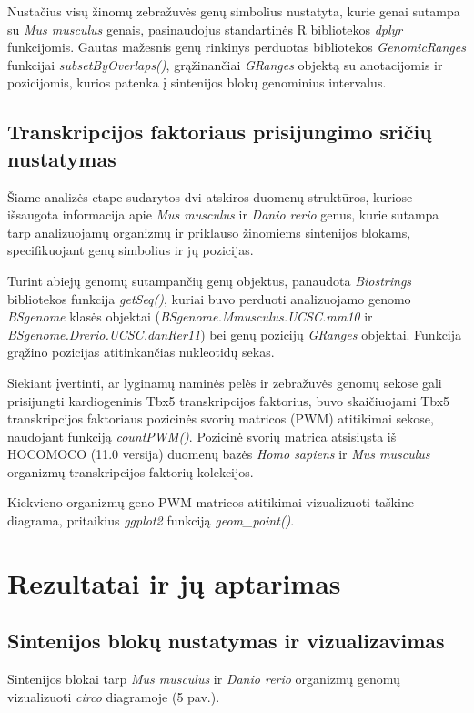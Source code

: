 \documentclass[12pt]{article}
\begin{document}
Nustačius visų žinomų zebražuvės genų simbolius nustatyta, kurie genai sutampa
su \emph{Mus musculus} genais, pasinaudojus standartinės R bibliotekos
\emph{dplyr}\cite{DPLYR} funkcijomis. Gautas mažesnis genų rinkinys perduotas
bibliotekos \emph{GenomicRanges}\cite{GRANGES} funkcijai
\emph{subsetByOverlaps()}, grąžinančiai \emph{GRanges} objektą su anotacijomis
ir pozicijomis, kurios patenka į sintenijos blokų genominius intervalus.

\subsection{Transkripcijos faktoriaus prisijungimo sričių nustatymas}
Šiame analizės etape sudarytos dvi atskiros duomenų struktūros, kuriose
išsaugota informacija apie \emph{Mus musculus} ir \emph{Danio rerio} genus,
kurie sutampa tarp analizuojamų organizmų ir priklauso žinomiems sintenijos
blokams, specifikuojant genų simbolius ir jų pozicijas.

Turint abiejų genomų sutampančių genų objektus, panaudota
\emph{Biostrings}\cite{BIOSTRINGS}
bibliotekos funkcija \emph{getSeq()}, kuriai buvo perduoti analizuojamo genomo
\emph{BSgenome}\cite{BSGENOME} klasės objektai
(\emph{BSgenome.Mmusculus.UCSC.mm10} ir \emph{BSgenome.Drerio.UCSC.danRer11})
bei genų pozicijų \emph{GRanges} objektai. Funkcija grąžino pozicijas
atitinkančias nukleotidų sekas.

Siekiant įvertinti, ar lyginamų naminės pelės ir zebražuvės genomų sekose gali
prisijungti kardiogeninis Tbx5 transkripcijos faktorius, buvo skaičiuojami Tbx5
transkripcijos faktoriaus pozicinės svorių matricos (PWM) atitikimai sekose,
naudojant funkciją \emph{countPWM()}. Pozicinė svorių matrica atsisiųsta iš
HOCOMOCO\cite{HOCOMOCO} (11.0 versija) duomenų bazės \emph{Homo sapiens} ir
\emph{Mus musculus} organizmų transkripcijos faktorių kolekcijos.

Kiekvieno organizmų geno PWM matricos atitikimai vizualizuoti taškine diagrama,
pritaikius \emph{ggplot2} funkciją \emph{geom\_point()}.

\newpage


\section{Rezultatai ir jų aptarimas}
\subsection{Sintenijos blokų nustatymas ir vizualizavimas}
Sintenijos blokai tarp \emph{Mus musculus} ir \emph{Danio rerio} organizmų
genomų vizualizuoti \emph{circo} diagramoje (5 pav.).
\end{document}
